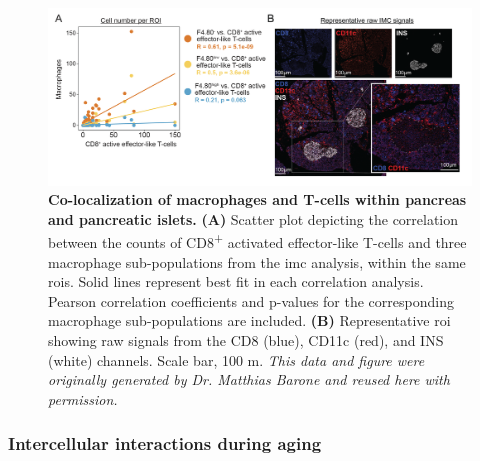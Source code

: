 \begin{figure}[t!]
\centering
\includegraphics[width=\linewidth]{Chapter4/Fig/F2-8-01.png}
\caption[Co-localization of macrophages and T-cells within pancreas]{\textbf{Co-localization of macrophages and T-cells within pancreas and pancreatic islets.} \textbf{(A)} Scatter plot depicting the correlation between the counts of CD8\textsuperscript{+} activated effector-like T-cells and three macrophage sub-populations from the \gls{imc} analysis, within the same \glspl{roi}. Solid lines represent best fit in each correlation analysis. Pearson correlation coefficients and p-values for the corresponding macrophage sub-populations are included. \textbf{(B)} Representative \gls{roi} showing raw signals from the CD8 (blue), CD11c (red), and INS (white) channels. Scale bar, 100 \textmu m. \textit{This data and figure were originally generated by Dr. Matthias Barone and reused here with permission.}}
\label{fig:chp2_imc_correlation}

\end{figure}


\subsubsection{\large Intercellular interactions during aging}


